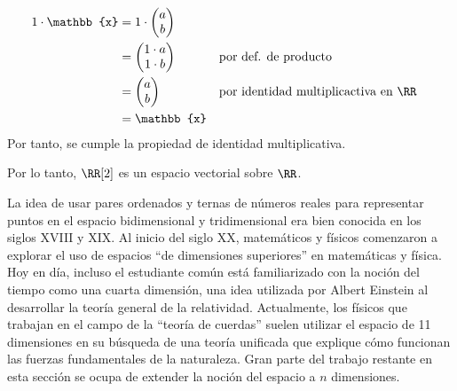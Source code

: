 \begin{examplebox}{}{}
\begin{enumerate}[label=\roman*), topsep=6pt, itemsep=0pt]
\begin{align*}
            1 \cdot \mathbb{x} & = 1 \cdot \begin{pmatrix}
                a \\
                b
            \end{pmatrix} \\
            & = \begin{pmatrix}
                1 \cdot a \\
                1 \cdot b
            \end{pmatrix} && \text{por def. de producto} \\
            & = \begin{pmatrix}
                a \\
                b
            \end{pmatrix} && \text{por identidad multiplicactiva en $\RR$} \\
            & = \mathbb{x}
        \end{align*}
        Por tanto, se cumple la propiedad de identidad multiplicativa.
    \end{enumerate}
    Por lo tanto, $\RR[2]$ es un espacio vectorial sobre $\RR$.
\end{examplebox}

La idea de usar pares ordenados y ternas de números reales para representar puntos en el espacio bidimensional y tridimensional era bien conocida en los siglos XVIII y XIX. Al inicio del siglo XX, matemáticos y físicos comenzaron a explorar el uso de espacios “de dimensiones superiores” en matemáticas y física. Hoy en día, incluso el estudiante común está familiarizado con la noción del tiempo como una cuarta dimensión, una idea utilizada por Albert Einstein al desarrollar la teoría general de la relatividad. Actualmente, los físicos que trabajan en el campo de la “teoría de cuerdas” suelen utilizar el espacio de 11 dimensiones en su búsqueda de una teoría unificada que explique cómo funcionan las fuerzas fundamentales de la naturaleza. Gran parte del trabajo restante en esta sección se ocupa de extender la noción del espacio a $n$ dimensiones.

